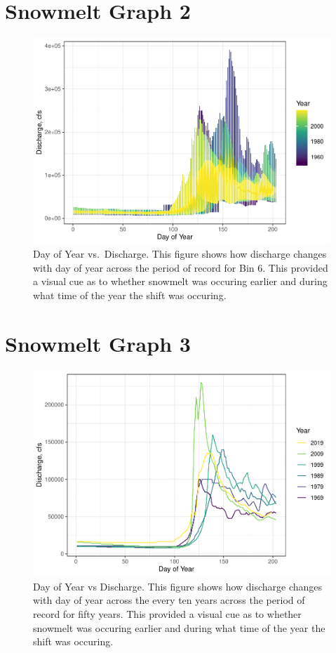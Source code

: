 \documentclass[12pt,]{article}
\begin{document}
\hypertarget{snowmelt-graph-2}{%
\section{Snowmelt Graph 2}\label{snowmelt-graph-2}}

\begin{figure}
\centering
\includegraphics{Project_Report_v2_files/figure-latex/Snowmelt Day of Year Exploratory Graph 2-1.pdf}
\caption{Day of Year vs.~Discharge. This figure shows how discharge
changes with day of year across the period of record for Bin 6. This
provided a visual cue as to whether snowmelt was occuring earlier and
during what time of the year the shift was occuring.}
\end{figure}

\hypertarget{snowmelt-graph-3}{%
\section{Snowmelt Graph 3}\label{snowmelt-graph-3}}

\begin{figure}
\centering
\includegraphics{Project_Report_v2_files/figure-latex/Snowmelt Day of Year Exploratory Graph 3-1.pdf}
\caption{Day of Year vs Discharge. This figure shows how discharge
changes with day of year across the every ten years across the period of
record for fifty years. This provided a visual cue as to whether
snowmelt was occuring earlier and during what time of the year the shift
was occuring.}
\end{figure}
\end{document}
